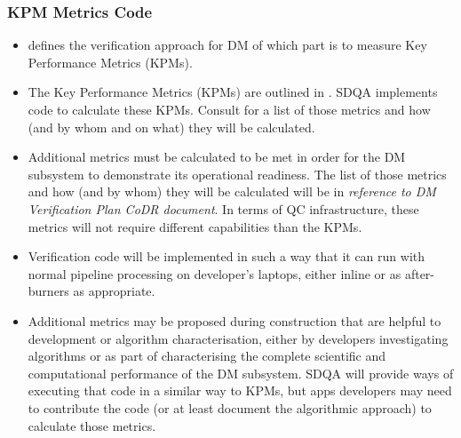 \documentclass[DM,toc,lsstdraft]{lsstdoc}
\begin{document}
\subsubsection{KPM Metrics Code}
\label{sec:qaVerify}
\begin{itemize}
	\item {} defines the verification approach for DM of which part is to measure Key Performance Metrics (KPMs).

\item The Key Performance Metrics (KPMs) are outlined in . SDQA implements code to calculate these KPMs. Consult  for a list of those metrics and how (and by whom and on what) they will be calculated.

\item Additional metrics must be calculated to be met in order for the DM subsystem to demonstrate its operational readiness. The list of those metrics and how (and by whom) they will be calculated will be in \emph{reference to DM Verification Plan CoDR document}. In terms of QC infrastructure, these metrics will not require different capabilities than the KPMs.

\item Verification code will be implemented in such a way that it can run with normal pipeline processing on developer's laptops, either inline or as after-burners as appropriate.

\item Additional metrics may be proposed during construction that are helpful to development or algorithm characterisation, either by developers investigating algorithms or as part of characterising the complete scientific and computational performance of the DM subsystem. SDQA will provide ways of executing that code in a similar way to KPMs, but apps developers may need to contribute the code (or at least document the algorithmic approach) to calculate those metrics.

\end{itemize}
\end{document}
